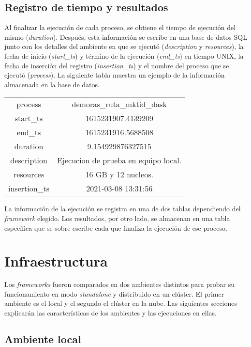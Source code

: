 \subsection{Registro de tiempo y resultados}

Al finalizar la ejecución de cada proceso, se obtiene el tiempo de ejecución del mismo (\textit{duration}). Después, esta información se escribe en una base de datos SQL junto con los detalles del ambiente en que se ejecutó (\textit{description} y \textit{resources}), la fecha de inicio (\textit{start\_ts}) y término de la ejecución (\textit{end\_ts}) en tiempo UNIX, la fecha de inserción del registro (\textit{insertion\_ts}) y el nombre del proceso que se ejecutó (\textit{process}). La siguiente tabla muestra un ejemplo de la información almacenada en la base de datos.

\begin{center}
\begin{tabular}{|c|c|}
 \hline
  process & demoras\_ruta\_mktid\_dask \\ 
  start\_ts & 1615231907.4139209 \\
  end\_ts & 1615231916.5688508 \\ 
  duration & 9.154929876327515 \\ 
  description & Ejecucion de prueba en equipo local. \\
  resources & 16 GB y 12 nucleos. \\
  insertion\_ts & 2021-03-08 13:31:56 \\
  \hline
\end{tabular}
\end{center}


La información de la ejecución se registra en una de dos tablas dependiendo del \textit{framework} elegido. Los resultados, por otro lado, se almacenan en una tabla específica que se sobre escribe cada que finaliza la ejecución de ese proceso. 

\section{Infraestructura}

Los \textit{frameworks} fueron comparados en dos ambientes distintos para probar su funcionamiento en modo \textit{standalone} y distribuido en un clúster. El primer ambiente es el local y el segundo el clúster en la nube. Las siguientes secciones explicarán las características de los ambientes y las ejecuciones en ellas.

\subsection{Ambiente local}

